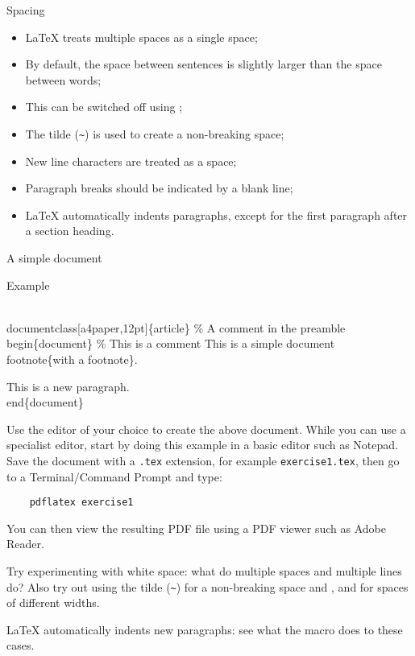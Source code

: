 \begin{frame}[fragile]{Spacing}

  \begin{itemize}
    \item \LaTeX{} treats multiple spaces as a single space;
    \item By default, the space between sentences is slightly larger
      than the space between words;
    \item This can be switched off using ;
    \item The tilde (\verb|~|) is used to create a non-breaking space;
    \item New line characters are treated as a space;
    \item Paragraph breaks should be indicated by a blank line;
    \item \LaTeX{} automatically indents paragraphs, except for the
      first paragraph after a section heading.
  \end{itemize}
  
\end{frame}

\begin{frame}[fragile]{A simple document}
  \begin{block}{Example}
    \begin{semiverbatim}
\alert<2>{\\documentclass}\alert<2,4>{[a4paper,12pt]}\alert<2-3>{\{article\}}
\alert<5>{\% A comment in the preamble}
\alert<6>{\\begin\{document\}}
\alert<7>{\% This is a comment}
\alert<8>{This is   a simple}
\alert<8>{document\\footnote\{with a footnote\}.}

\alert<8>{This is a new paragraph.}
\alert<6>{\\end\{document\}}
    \end{semiverbatim}
  \end{block}
  
\end{frame}

\begin{exercise}
  Use the editor of your choice to create the above document. While you
  can use a specialist editor, start by doing this example in a basic
  editor such as Notepad. Save the document with a \texttt{.tex}
  extension, for example \texttt{exercise1.tex}, then go to a
  Terminal/Command Prompt and type:
  \begin{verbatim}
    pdflatex exercise1
  \end{verbatim}
  You can then view the resulting PDF file using a PDF viewer such as
  Adobe Reader.
  
  Try experimenting with white space: what do multiple spaces and 
  multiple lines do? Also try out using the tilde (\verb"~") for 
  a non-breaking space and \cs{,}, \cs{:} and \cs{;} for spaces of different
  widths.
  
  \LaTeX{} automatically indents new paragraphs: see what the 
  macro does to these cases.
\end{exercise}

